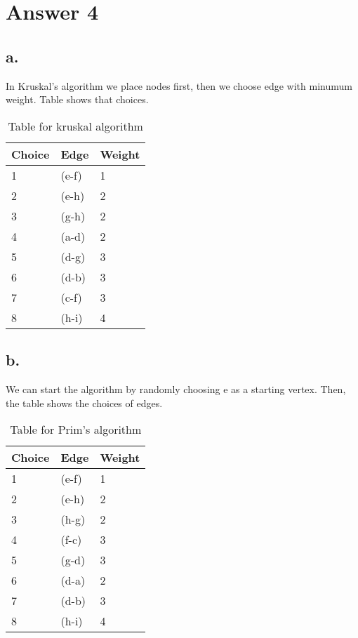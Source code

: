 \documentclass[11pt]{article}
\begin{document}
\section*{Answer 4}
\subsection*{a.}
In Kruskal's algorithm we place nodes first, then we choose edge with minumum weight. Table shows that choices.
\begin{table}[H]
\centering
\caption{Table for kruskal algorithm}
\label{a.}
\begin{tabular}{|l|l|l|}
\hline
 Choice & Edge  & Weight  \\ \hline
 1& (e-f) & 1 \\ \hline
 2& (e-h) & 2 \\ \hline
 3& (g-h) &  2\\ \hline
 4& (a-d) & 2 \\ \hline
 5& (d-g) & 3 \\ \hline
 6& (d-b) &  3\\ \hline
 7& (c-f) &  3\\ \hline
 8& (h-i) & 4 \\ \hline
\end{tabular}
\end{table}



\subsection*{b.}

We can start the algorithm by randomly choosing e as a starting vertex. Then, the table shows the choices of edges.
\begin{table}[H]
\centering
\caption{Table for Prim's algorithm}
\label{b.}
\begin{tabular}{|l|l|l|}
\hline
 Choice & Edge  & Weight  \\ \hline
1 & (e-f) & 1 \\ \hline
 2& (e-h) & 2 \\ \hline
3 & (h-g) &  2\\ \hline
 4& (f-c) & 3 \\ \hline
 5& (g-d) & 3 \\ \hline
 6& (d-a) &  2\\ \hline
 7& (d-b) &  3\\ \hline
 8& (h-i) & 4 \\ \hline
\end{tabular}
\end{table}
\end{document}
